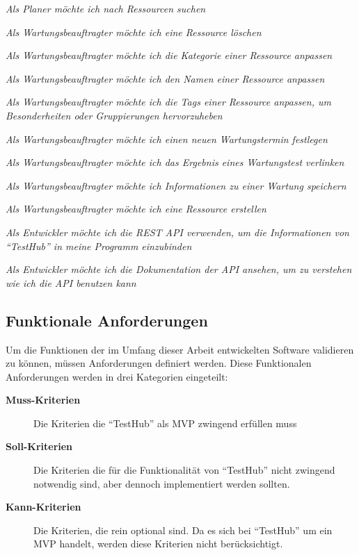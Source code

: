 \begin{description}
    \textit{Als Planer möchte ich nach Ressourcen suchen}

    \textit{Als Wartungsbeauftragter möchte ich eine Ressource löschen}

    \textit{Als Wartungsbeauftragter möchte ich die Kategorie einer Ressource anpassen}

    \textit{Als Wartungsbeauftragter möchte ich den Namen einer Ressource anpassen}

    \textit{Als Wartungsbeauftragter möchte ich die Tags einer Ressource anpassen,
    um Besonderheiten oder Gruppierungen hervorzuheben}

    \textit{Als Wartungsbeauftragter möchte ich einen neuen Wartungstermin festlegen}

    \textit{Als Wartungsbeauftragter möchte ich das Ergebnis eines Wartungstest verlinken}

    \textit{Als Wartungsbeauftragter möchte ich Informationen zu einer Wartung speichern}

    \textit{Als Wartungsbeauftragter möchte ich eine Ressource erstellen}

    \textit{Als Entwickler möchte ich die REST API verwenden, um die
    Informationen von ``TestHub'' in meine Programm einzubinden}

    \textit{Als Entwickler möchte ich die Dokumentation
    der API ansehen, um zu verstehen wie ich die API benutzen kann}

\end{description}

\subsection{Funktionale Anforderungen}\label{sec:fas}
Um die Funktionen der im Umfang dieser Arbeit entwickelten Software validieren zu
können, müssen Anforderungen definiert werden. Diese Funktionalen Anforderungen
werden in drei Kategorien eingeteilt:

\begin{description}
    \item[\textbf{Muss-Kriterien}]Die Kriterien die ``TestHub'' als \gls{MVP} zwingend erfüllen muss

    \item[\textbf{Soll-Kriterien}]Die Kriterien die für die Funktionalität von ``TestHub''
    nicht zwingend notwendig sind, aber dennoch implementiert werden sollten.

    \item[\textbf{Kann-Kriterien}]Die Kriterien, die rein optional sind. Da es sich
    bei ``TestHub'' um ein \gls{MVP} handelt, werden diese Kriterien nicht berücksichtigt.

\end{description}

